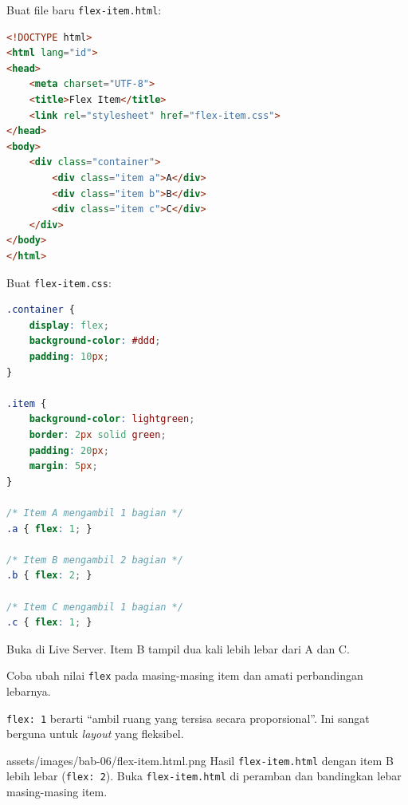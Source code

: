 \begin{langkah}
  \item Buat file baru \texttt{flex-item.html}:
\end{langkah}

\begin{lstlisting}[language=HTML, caption={Struktur flex-item.html}, label={lst:flex-item-html}]
<!DOCTYPE html>
<html lang="id">
<head>
    <meta charset="UTF-8">
    <title>Flex Item</title>
    <link rel="stylesheet" href="flex-item.css">
</head>
<body>
    <div class="container">
        <div class="item a">A</div>
        <div class="item b">B</div>
        <div class="item c">C</div>
    </div>
</body>
</html>
\end{lstlisting}

\begin{langkah}
  \item Buat \texttt{flex-item.css}:
\end{langkah}

\begin{lstlisting}[language=CSS, caption={Proporsi flex item}, label={lst:flex-item-css}]
.container {
    display: flex;
    background-color: #ddd;
    padding: 10px;
}

.item {
    background-color: lightgreen;
    border: 2px solid green;
    padding: 20px;
    margin: 5px;
}

/* Item A mengambil 1 bagian */
.a { flex: 1; }

/* Item B mengambil 2 bagian */
.b { flex: 2; }

/* Item C mengambil 1 bagian */
.c { flex: 1; }
\end{lstlisting}

\begin{langkah}
  \item Buka di Live Server. Item B tampil dua kali lebih lebar dari A dan C.
  \item Coba ubah nilai \texttt{flex} pada masing-masing item dan amati perbandingan lebarnya.
\end{langkah}

\begin{tip}
\texttt{flex: 1} berarti ``ambil ruang yang tersisa secara proporsional''. Ini sangat berguna untuk \emph{layout} yang fleksibel.
\end{tip}

\begin{tangkapanlayar}
  {assets/images/bab-06/flex-item.html.png}
  {Hasil \texttt{flex-item.html} dengan item B lebih lebar (\texttt{flex: 2}).}
  {Buka \texttt{flex-item.html} di peramban dan bandingkan lebar masing-masing item.}
\end{tangkapanlayar}

